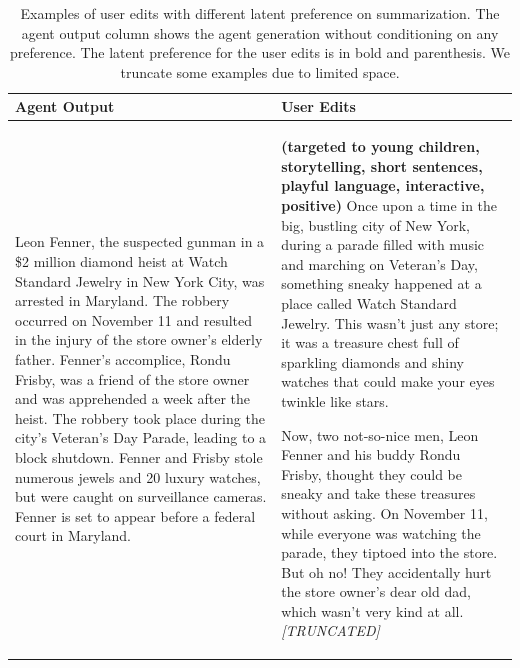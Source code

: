 \begin{table}[h!]
    \centering \small
    \caption{Examples of user edits with different latent preference on summarization. The agent output column shows the agent generation without conditioning on any preference. The latent preference for the user edits is in bold and parenthesis. We truncate some examples due to limited space. }
    \begin{tabular}{p{} p{}}
        \toprule
        \textbf{Agent Output}  & \textbf{User Edits} \\
        \midrule
Leon Fenner, the suspected gunman in a \$2 million diamond heist at Watch Standard Jewelry in New York City, was arrested in Maryland. The robbery occurred on November 11 and resulted in the injury of the store owner's elderly father. Fenner's accomplice, Rondu Frisby, was a friend of the store owner and was apprehended a week after the heist. The robbery took place during the city's Veteran's Day Parade, leading to a block shutdown. Fenner and Frisby stole numerous jewels and 20 luxury watches, but were caught on surveillance cameras. Fenner is set to appear before a federal court in Maryland. 
& \textbf{(targeted to young children, storytelling, short sentences, playful language, interactive, positive)} \newline
Once upon a time in the big, bustling city of New York, during a parade filled with music and marching on Veteran's Day, something sneaky happened at a place called Watch Standard Jewelry. This wasn't just any store; it was a treasure chest full of sparkling diamonds and shiny watches that could make your eyes twinkle like stars.

Now, two not-so-nice men, Leon Fenner and his buddy Rondu Frisby, thought they could be sneaky and take these treasures without asking. On November 11, while everyone was watching the parade, they tiptoed into the store. But oh no! They accidentally hurt the store owner's dear old dad, which wasn't very kind at all.
\textit{[TRUNCATED]} \\




\end{tabular}
\end{table}

